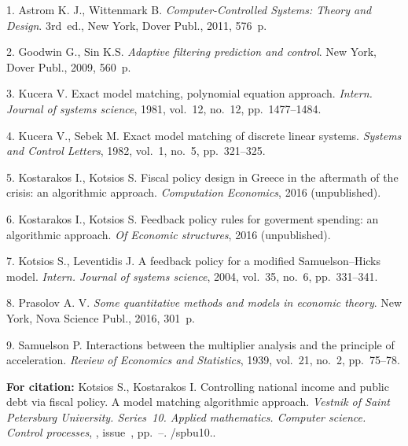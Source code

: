 


{\footnotesize

\vskip 3mm


\vskip 2mm

1.     Astrom K. J., Wittenmark B. \textit{Computer-Controlled
Systems: Theory and Design}. 3rd~ed., New York, Dover Publ., 2011,
576~p.

2.  Goodwin G., Sin K.S. \textit{Adaptive filtering prediction and
control}. New York, Dover Publ., 2009, 560~p.

3. Kucera V. Exact model matching, polynomial equation approach.
\textit{Intern. Journal of systems science}, 1981, vol.~12,
no.~12, pp.~1477--1484.

4.  Kucera V., Sebek M. Exact model matching of discrete linear
systems. \textit{Systems and Control Letters}, 1982, vol.~1,
no.~5, pp.~321--325.

5.  Kostarakos I., Kotsios S. Fiscal policy design in Greece in
the aftermath of the crisis: an algorithmic approach.
\emph{Computation Economics}, 2016 (unpublished).

6.  Kostarakos I., Kotsios S. Feedback policy rules for goverment
spending: an algorithmic approach. \emph{Of Economic structures},
2016 (unpublished).

7.  Kotsios S., Leventidis J. A feedback policy for a modified
Samuelson--Hicks model. \textit{Intern. Journal of systems
science}, 2004, vol.~35, no.~6, pp.~331--341.

8.  Prasolov A. V. \textit{Some quantitative methods and models in
economic theory}. New York, Nova Science Publ., 2016, 301~p.

9.   Samuelson P. Interactions between the multiplier analysis and
the principle of acceleration. \textit{Review of Economics and
Statistics}, 1939, vol.~21, no.~2, pp.~75--78.



\vskip 1mm

{\bf For citation:} Kotsios S., Kostarakos I. Controlling national
income and public debt via fiscal policy. A model matching
algorithmic approach. {\it Vestnik of Saint Petersburg University.
Series~10. Applied mathematics. Computer science. Control
processes}, \issueyear, issue~\issuenum,
pp.~\pageref{p8}--\pageref{p8e}.
\doivyp/spbu10.\issueyear.


}
